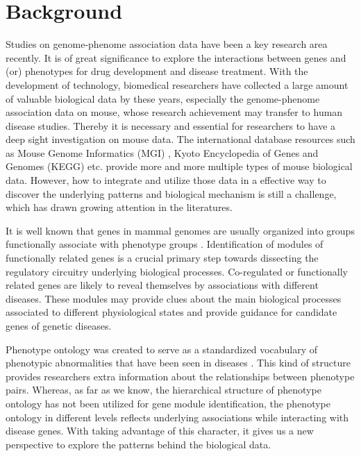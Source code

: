 \documentclass{bmcart}
\begin{document}
\section*{Background}
Studies on genome-phenome association data have been a key research area recently. It is of great significance to explore the interactions between genes and (or) phenotypes for drug development and disease treatment. With the development of technology, biomedical researchers have collected a large amount of valuable biological data by these years, especially the genome-phenome association data on mouse, whose research achievement may transfer to human disease studies. Thereby it is necessary and essential for researchers to have a deep sight investigation on mouse data. The international database resources such as Mouse Genome Informatics (MGI) \cite{Eppig2015}, Kyoto Encyclopedia of Genes and Genomes (KEGG) \cite{Kanehisa2000} etc. provide more and more multiple types of mouse biological data. However, how to integrate and utilize those data in a effective way to discover the underlying patterns and biological mechanism is still a challenge, which has drawn growing attention in the literatures.

It is well known that genes in mammal genomes are usually organized into groups functionally associate with phenotype groups \cite{XuanH2015,Lage2007}. Identification of modules of functionally related genes is a crucial primary step towards dissecting the regulatory circuitry underlying biological processes. Co-regulated or functionally related genes are likely to reveal themselves by associations with different diseases. These modules may provide clues about the main biological processes associated to different physiological states and provide guidance for candidate genes of genetic diseases.


Phenotype ontology was created to serve as a standardized vocabulary of phenotypic abnormalities that have been seen in diseases \cite{Kohler2014}. This kind of structure provides researchers extra information about the relationships between phenotype pairs. Whereas, as far as we know, the hierarchical structure of phenotype ontology has not been utilized for gene module identification, the phenotype ontology in different levels reflects underlying associations while interacting with disease genes. With taking advantage of this character, it gives us a new perspective to explore the patterns behind the biological data.
\end{document}
